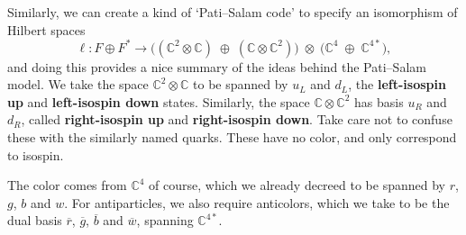 \documentclass{article}
\newcommand{\maps}{\colon}    %
\newcommand{\C}{{\mathbb C}}  %
\newcommand{\rbar}{{\overline{r}}} %
\newcommand{\gbar}{{\overline{g}}} %
\newcommand{\bbar}{{\overline{b}}} %
\newcommand{\wbar}{{\overline{w}}} %
\newcommand{\define}[1]{{\bf #1}}
\begin{document}
Similarly, we can create a kind of `Pati--Salam code' to specify an 
isomorphism of Hilbert spaces
\[  \ell \maps F
\oplus F^* \to \big((\C^2 \otimes \C) \; \oplus \; (\C \otimes \C^2)\big) \;
\otimes \; \big(\C^4 \; \oplus \; \C^{4*}\big), \]
and doing this provides a nice
summary of the ideas behind the Pati--Salam model. We take the space
$\C^2 \otimes \C$ to be spanned by $u_L$ and $d_L$, the \define{left-isospin
up} and \define{left-isospin down} states. Similarly, the space $\C \otimes
\C^2$ has basis $u_R$ and $d_R$, called \define{right-isospin up} and
\define{right-isospin down}. Take care not to confuse these with the similarly
named quarks. These have no color, and only correspond to isospin.

The color comes from $\C^4$ of course, which we already decreed to be spanned
by $r$, $g$, $b$ and $w$. For antiparticles, we also require anticolors, which
we take to be the dual basis $\rbar$, $\gbar$, $\bbar$ and $\wbar$, spanning
$\C^{4*}$.
\end{document}
